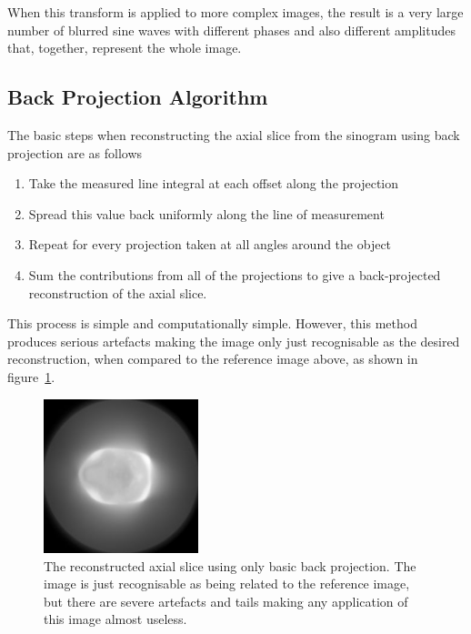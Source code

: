             When this transform is applied to more complex images, the result is a very large number of blurred sine waves with different phases and also different amplitudes that, together, represent the whole image.
        \subsection{Back Projection Algorithm} %
        \label{sub:back_projection_algorithm}
            The basic steps when reconstructing the axial slice from the sinogram using back projection are as follows
            \begin{enumerate}
                \item Take the measured line integral at each offset along the projection
                \item Spread this value back uniformly along the line of measurement
                \item Repeat for every projection taken at all angles around the object
                \item Sum the contributions from all of the projections to give a back-projected reconstruction of the axial slice.
            \end{enumerate}

            This process is simple and computationally simple. However, this method produces serious artefacts making the image only just recognisable as the desired reconstruction, when compared to the reference image above, as shown in figure~\ref{fig:simple_backprojection}.
            \begin{figure}[ht]
                \begin{center}
                    \includegraphics[width=0.4\textwidth]{Files/report_images/simple_backprojection.jpg}
                \end{center}
                \caption{The reconstructed axial slice using only basic back projection. The image is just recognisable as being related to the reference image, but there are severe artefacts and tails making any application of this image almost useless.\label{fig:simple_backprojection}}
            \end{figure}

